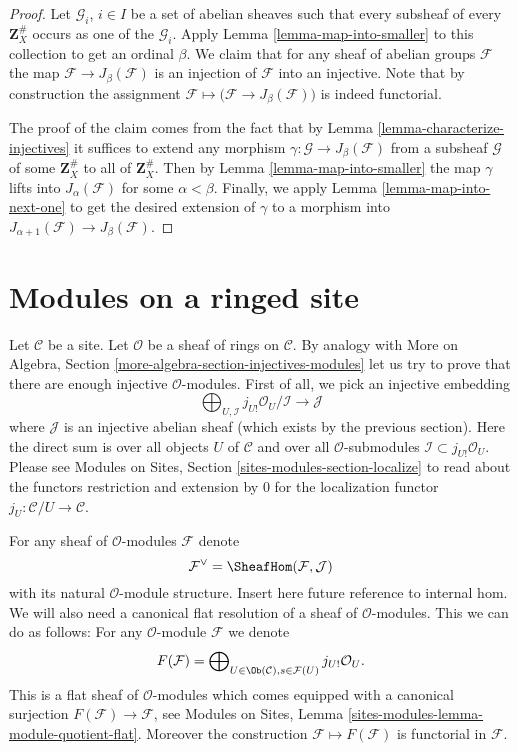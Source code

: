 \begin{proof}
Let $\mathcal{G}_i$, $i \in I$ be a set of abelian
sheaves such that every subsheaf of every $\mathbf{Z}_X^\#$
occurs as one of the $\mathcal{G}_i$. Apply
Lemma \ref{lemma-map-into-smaller} to this collection to
get an ordinal $\beta$. We claim that for any sheaf of abelian
groups $\mathcal{F}$ the map $\mathcal{F} \to J_\beta(\mathcal{F})$
is an injection of $\mathcal{F}$ into an injective.
Note that by construction the assignment
$\mathcal{F} \mapsto \big(\mathcal{F} \to J_\beta(\mathcal{F})\big)$
is indeed functorial.

\medskip\noindent
The proof of the claim comes from the fact that by
Lemma \ref{lemma-characterize-injectives} it suffices to extend any
morphism $\gamma : \mathcal{G} \to J_\beta(\mathcal{F})$
from a subsheaf $\mathcal{G}$ of some $\mathbf{Z}_X^\#$ to all of
$\mathbf{Z}_X^\#$. Then by Lemma \ref{lemma-map-into-smaller} the
map $\gamma$ lifts into $J_\alpha(\mathcal{F})$ for some
$\alpha < \beta$. Finally, we apply Lemma \ref{lemma-map-into-next-one}
to get the desired extension of $\gamma$ to a morphism
into $J_{\alpha + 1}(\mathcal{F}) \to J_\beta(\mathcal{F})$.
\end{proof}






\section{Modules on a ringed site}
\label{section-sheaves-modules}

\noindent
Let $\mathcal{C}$ be a site.
Let $\mathcal{O}$ be a sheaf of rings on $\mathcal{C}$.
By analogy with
More on Algebra, Section \ref{more-algebra-section-injectives-modules}
let us try to prove that there are enough injective
$\mathcal{O}$-modules. First of all, we pick an injective
embedding
$$
\bigoplus\nolimits_{U, \mathcal{I}}
j_{U!}\mathcal{O}_U/\mathcal{I}
\longrightarrow
\mathcal{J}
$$
where $\mathcal{J}$ is an injective abelian sheaf (which
exists by the previous section). Here the direct sum is
over all objects $U$ of $\mathcal{C}$ and over all
$\mathcal{O}$-submodules $\mathcal{I} \subset j_{U!}\mathcal{O}_U$.
Please see
Modules on Sites, Section \ref{sites-modules-section-localize}
to read about the functors restriction and
extension by $0$ for the localization functor
$j_U : \mathcal{C}/U \to \mathcal{C}$.

\medskip\noindent
For any sheaf of $\mathcal{O}$-modules $\mathcal{F}$ denote
$$
\mathcal{F}^\vee
=
\SheafHom(\mathcal{F}, \mathcal{J})
$$
with its natural $\mathcal{O}$-module structure.
Insert here future reference to internal hom.
We will also need
a canonical flat resolution of a sheaf of $\mathcal{O}$-modules.
This we can do as follows: For any $\mathcal{O}$-module
$\mathcal{F}$ we denote
$$
F(\mathcal{F})
=
\bigoplus\nolimits_{U \in \Ob(\mathcal{C}), s \in \mathcal{F}(U)}
j_{U!}\mathcal{O}_U.
$$
This is a flat sheaf of $\mathcal{O}$-modules which comes equipped
with a canonical surjection $F(\mathcal{F}) \to \mathcal{F}$, see
Modules on Sites, Lemma \ref{sites-modules-lemma-module-quotient-flat}.
Moreover the construction $\mathcal{F} \mapsto F(\mathcal{F})$
is functorial in $\mathcal{F}$.

